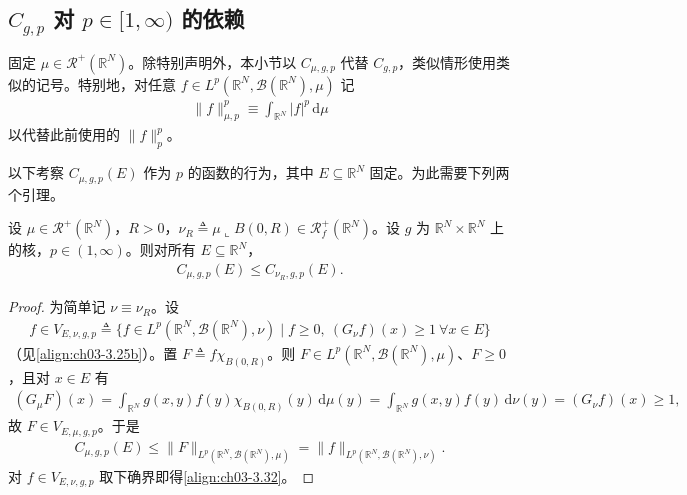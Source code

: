\documentclass[../../main.tex]{subfiles}%
\begin{document}
\subsection{$C_{g,p}$ 对 $p\in[1,\infty)$ 的依赖}\label{subsection:ch03-p依赖}

固定 $\mu\in\mathscr{R}^+(\mathbb{R}^N)$。除特别声明外，本小节以 $C_{\mu,g,p}$ 代替 $C_{g,p}$，类似情形使用类似的记号。特别地，对任意 $f\in L^p(\mathbb{R}^N,\mathcal{B}(\mathbb{R}^N),\mu)$ 记
\begin{align*}
\|f\|_{\mu,p}^p\equiv\int_{\mathbb{R}^N}|f|^p\,\mathrm{d}\mu
\end{align*}
以代替此前使用的 $\|f\|_p^p$。

以下考察 $C_{\mu,g,p}(E)$ 作为 $p$ 的函数的行为，其中 $E\subseteq\mathbb{R}^N$ 固定。为此需要下列两个引理。

\begin{lemma}\label{lemma:ch03-有限测度比较}
设 $\mu\in\mathscr{R}^+(\mathbb{R}^N)$，$R>0$，$\nu_R\triangleq\mu\llcorner B(0,R)\in\mathscr{R}^+_f(\mathbb{R}^N)$。设 $g$ 为 $\mathbb{R}^N\times\mathbb{R}^N$ 上的核，$p\in(1,\infty)$。则对所有 $E\subseteq\mathbb{R}^N$，
\begin{align}
C_{\mu,g,p}(E)\leqslant C_{\nu_R,g,p}(E).\label{align:ch03-3.32}
\end{align}
\end{lemma}

\begin{proof}
为简单记 $\nu\equiv\nu_R$。设
\begin{align*}
f\in V_{E,\nu,g,p}\triangleq\{f\in L^p(\mathbb{R}^N,\mathcal{B}(\mathbb{R}^N),\nu)\mid f\geqslant0,\ (G_\nu f)(x)\geqslant1\ \forall x\in E\}
\end{align*}
（见\eqref{align:ch03-3.25b}）。置 $F\triangleq f\chi_{B(0,R)}$。则 $F\in L^p(\mathbb{R}^N,\mathcal{B}(\mathbb{R}^N),\mu)$、$F\geqslant0$，且对 $x\in E$ 有
\begin{align*}
(G_\mu F)(x)=\int_{\mathbb{R}^N}g(x,y)f(y)\chi_{B(0,R)}(y)\,\mathrm{d}\mu(y)=\int_{\mathbb{R}^N}g(x,y)f(y)\,\mathrm{d}\nu(y)=(G_\nu f)(x)\geqslant1,
\end{align*}
故 $F\in V_{E,\mu,g,p}$。于是
\begin{align*}
C_{\mu,g,p}(E)\leqslant\|F\|_{L^p(\mathbb{R}^N,\mathcal{B}(\mathbb{R}^N),\mu)}=\|f\|_{L^p(\mathbb{R}^N,\mathcal{B}(\mathbb{R}^N),\nu)} .
\end{align*}
对 $f\in V_{E,\nu,g,p}$ 取下确界即得\eqref{align:ch03-3.32}。
\end{proof}
\end{document}

